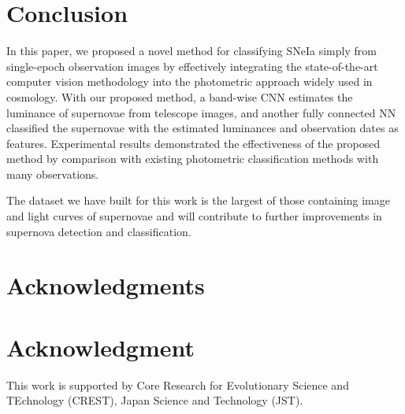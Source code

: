 \documentclass[conference,compsoc]{IEEEtran}
\begin{document}
\section{Conclusion}
\label{sec:conclude}

  In this paper, we proposed a novel method for classifying SNeIa simply from single-epoch observation images by effectively integrating the state-of-the-art computer vision methodology into the photometric approach widely used in cosmology.
  With our proposed method, a band-wise CNN estimates the luminance of supernovae from telescope images, and another fully connected NN classified the supernovae with the estimated luminances and observation dates as features.
  Experimental results demonstrated the effectiveness of the proposed method by comparison with existing photometric classification methods with many observations.

  The dataset we have built for this work is the largest of those containing image and light curves of supernovae and will contribute to further improvements in supernova detection and classification.



\ifCLASSOPTIONcompsoc
  \section*{Acknowledgments}
\else
  \section*{Acknowledgment}
\fi

  This work is supported by Core Research for Evolutionary Science and TEchnology (CREST), Japan Science and Technology (JST).






\end{document}
